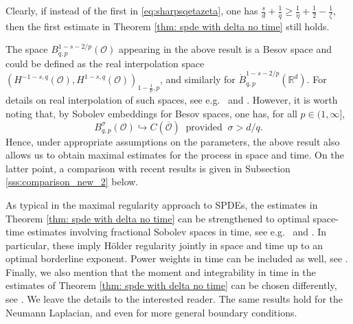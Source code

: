 \documentclass[reqno]{amsart}
\theoremstyle{plain}
\theoremstyle{remark}
\theoremstyle{plain}
\numberwithin{equation}{section}
\newcommand\cO{\mathcal{O}}
\def\R{{\mathbb R}}
\newcommand{\1}{\one}
\newcommand{\embed}{\hookrightarrow}
\begin{document}
Clearly, if instead of the first in \eqref{eq:sharpsqetazeta}, one has $\frac{s}{d} + \frac{1}{q}  \geq \frac{1}{\eta} + \frac{1}{2} - \frac{1}{\zeta}$, then the first estimate in Theorem \ref{thm: spde with delta no time} still holds.


The space $B^{1-s-2/p}_{q,p}(\cO)$ appearing in the above result is a Besov space and could be defined as the real interpolation space $(H^{-1-s,q}(\cO),H^{1-s,q}(\cO))_{1-\frac1p,p}$, and similarly for $\dot{B}^{1-s-2/p}_{q,p}(\R^d)$. For details on real interpolation of such spaces, see e.g.\ \cite[Chapter 14]{HNVW3} and \cite[Chapter 6]{BeLo}. However, it is worth noting that, by Sobolev embeddings for Besov spaces, one has, for all $p\in (1,\infty]$,
\begin{equation}
\label{eq:Besov_embedding_C}
B^{\sigma}_{q,p}(\cO)\embed C(\overline{\cO})\  \text{ provided }\  \sigma>d/q.
\end{equation}
Hence, under appropriate assumptions on the parameters, the above result also allows us to obtain maximal estimates for the process in space and time. On the latter point, a comparison with recent results is given in Subsection \ref{sss:comparison_new_2} below.

\smallskip

As typical in the maximal regularity approach to SPDEs, the estimates in Theorem \ref{thm: spde with delta no time} can be strengthened to optimal space-time estimates involving fractional Sobolev spaces in time, see e.g.\ \cite[Theorem 1.2(1)]{MaximalLpregularity} and \cite[Definition 3.7]{AV25_survey}. In particular, these imply  H\"older regularity jointly in space and time up to an optimal borderline exponent. 
Power weights in time can be included as well, see \cite{AV19}. 
Finally, we also mention that the moment and integrability in time in the estimates of Theorem \ref{thm: spde with delta no time} can be chosen differently, see \cite[Corollary 7.4]{NVW13}.
We leave the details to the interested reader. 
The same results hold for the Neumann Laplacian, and even for more general boundary conditions.
\end{document}
